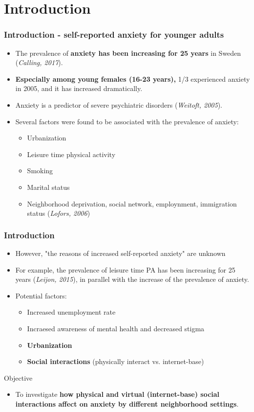 \documentclass[dvipdfmx]{beamer}\usepackage[]{graphicx}\usepackage[]{color}
\begin{document}
\section{Introduction}
\begin{frame}
	\frametitle{Introduction - self-reported anxiety for younger adults}
	\begin{itemize}
		\item The prevalence of \textbf{anxiety has been increasing for 25 years} in Sweden (\textit{Calling, 2017}).
		\item \textbf{Especially among young females (16-23 years),} 1/3 experienced anxiety in 2005, and it has increased dramatically.
		\item Anxiety is a predictor of severe psychiatric disorders (\textit{Weitoft, 2005}).
		\item Several factors were found to be associated with the prevalence of anxiety:
			\begin{itemize}
				\item Urbanization
				\item Leisure time physical activity
				\item Smoking
				\item Marital status
				\item Neighborhood deprivation, social network, employnment, immigration status (\textit{Lofors, 2006})
			\end{itemize}
	\end{itemize}
\end{frame}

\begin{frame}
	\frametitle{Introduction}
	\begin{itemize}
		\item However, "the reasons of increased self-reported anxiety" are unknown
		\item For example, the prevalence of leisure time PA has been increasing for 25 years (\textit{Leijon, 2015}), in parallel with the increase of the prevalence of anxiety.
		\item Potential factors:
			\begin{itemize}
				\item Increased unemployment rate
				\item Incraesed awareness of mental health and decreased stigma
				\item \textbf{Urbanization}
				\item \textbf{Social interactions} (physically interact vs. internet-base)
			\end{itemize}
	\end{itemize}
	\begin{block}{Objective}
		\begin{itemize}
			\item To investigate \textbf{how physical and virtual (internet-base) social interactions affect on anxiety by different neighborhood settings}.
		\end{itemize}
	\end{block}
\end{frame}
\end{document}
